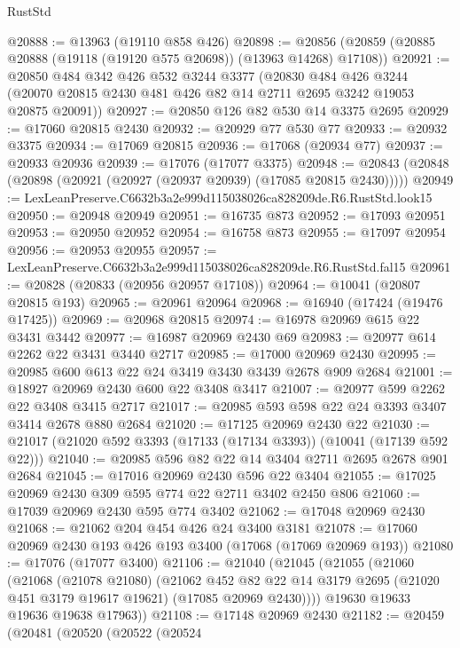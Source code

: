 \begin{lexlean}{RustStd}
\begin{coremodule}
@20888 := @13963 (@19110 @858 @426)
@20898 := @20856 (@20859 (@20885 @20888 (@19118 (@19120 @575 @20698)) (@13963 @14268) @17108))
@20921 := @20850
    @484
    @342
    @426
    @532
    @3244
    @3377
    (@20830
      @484
      @426
      @3244
      (@20070 @20815 @2430 @481 @426 @82 @14 @2711 @2695 @3242 @19053 @20875 @20091))
@20927 := @20850 @126 @82 @530 @14 @3375 @2695
@20929 := @17060 @20815 @2430
@20932 := @20929 @77 @530 @77
@20933 := @20932 @3375
@20934 := @17069 @20815
@20936 := @17068 (@20934 @77)
@20937 := @20933 @20936
@20939 := @17076 (@17077 @3375)
@20948 := @20843 (@20848 (@20898 (@20921 (@20927 (@20937 @20939) (@17085 @20815 @2430)))))
@20949 := LexLeanPreserve.C6632b3a2e999d115038026ca828209de.R6.RustStd.look15
@20950 := @20948 @20949
@20951 := @16735 @873
@20952 := @17093 @20951
@20953 := @20950 @20952
@20954 := @16758 @873
@20955 := @17097 @20954
@20956 := @20953 @20955
@20957 := LexLeanPreserve.C6632b3a2e999d115038026ca828209de.R6.RustStd.fal15
@20961 := @20828 (@20833 (@20956 @20957 @17108))
@20964 := @10041 (@20807 @20815 @193)
@20965 := @20961 @20964
@20968 := @16940 (@17424 (@19476 @17425))
@20969 := @20968 @20815
@20974 := @16978 @20969 @615 @22 @3431 @3442
@20977 := @16987 @20969 @2430 @69
@20983 := @20977 @614 @2262 @22 @3431 @3440 @2717
@20985 := @17000 @20969 @2430
@20995 := @20985 @600 @613 @22 @24 @3419 @3430 @3439 @2678 @909 @2684
@21001 := @18927 @20969 @2430 @600 @22 @3408 @3417
@21007 := @20977 @599 @2262 @22 @3408 @3415 @2717
@21017 := @20985 @593 @598 @22 @24 @3393 @3407 @3414 @2678 @880 @2684
@21020 := @17125 @20969 @2430 @22
@21030 := @21017 (@21020 @592 @3393 (@17133 (@17134 @3393)) (@10041 (@17139 @592 @22)))
@21040 := @20985 @596 @82 @22 @14 @3404 @2711 @2695 @2678 @901 @2684
@21045 := @17016 @20969 @2430 @596 @22 @3404
@21055 := @17025 @20969 @2430 @309 @595 @774 @22 @2711 @3402 @2450 @806
@21060 := @17039 @20969 @2430 @595 @774 @3402
@21062 := @17048 @20969 @2430
@21068 := @21062 @204 @454 @426 @24 @3400 @3181
@21078 := @17060 @20969 @2430 @193 @426 @193 @3400 (@17068 (@17069 @20969 @193))
@21080 := @17076 (@17077 @3400)
@21106 := @21040
    (@21045
      (@21055
        (@21060
          (@21068
            (@21078 @21080)
            (@21062
              @452
              @82
              @22
              @14
              @3179
              @2695
              (@21020 @451 @3179 @19617 @19621)
              (@17085 @20969 @2430))))
        @19630
        @19633
        @19636
        @19638
        @17963))
@21108 := @17148 @20969 @2430
@21182 := @20459
    (@20481
      (@20520
        (@20522
          (@20524

\end{coremodule}
\end{lexlean}
